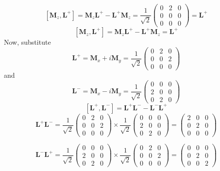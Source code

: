 \documentclass{styles/kaobook}
\begin{document}
$$
\left[\mathbf{M}_{z}, \mathbf{L}^{+}\right]=\mathbf{M}_{z} \mathbf{L}^{+}-\mathbf{L}^{+} \mathbf{M}_{z}=\frac{1}{\sqrt{2}}\left(\begin{array}{ccc}
0 & 2 & 0 \\
0 & 0 & 0 \\
0 & 0 & 0
\end{array}\right)=\mathbf{L}^{+}
$$
$$
\left[\mathbf{M}_{z}, \mathbf{L}^{+}\right]=\mathbf{M}_{z} \mathbf{L}^{+}-\mathbf{L}^{+} \mathbf{M}_{z}=\mathbf{L}^{+}
$$
Now, substitute 
$$
\mathbf{L}^{+}=\mathbf{M}_{x}+i \mathbf{M}_{y}=\frac{1}{\sqrt{2}}\left(\begin{array}{lll}
0 & 2 & 0 \\
0 & 0 & 2 \\
0 & 0 & 0
\end{array}\right)
$$
and
$$
\mathbf{L}^{-}=\mathbf{M}_{x}-i \mathbf{M}_{y}=\frac{1}{\sqrt{2}}\left(\begin{array}{ccc}
0 & 0 & 0 \\
2 & 0 & 0 \\
0 & 2 & 0
\end{array}\right)
$$
$$
\left[\mathbf{L}^{+}, \mathbf{L}^{-}\right]=\mathbf{L}^{+} \mathbf{L}^{-}-\mathbf{L}^{-} \mathbf{L}^{+}
$$
$$
\mathbf{L}^{+} \mathbf{L}^{-}=\frac{1}{\sqrt{2}}\left(\begin{array}{lll}
0 & 2 & 0 \\
0 & 0 & 2 \\
0 & 0 & 0
\end{array}\right) \times \frac{1}{\sqrt{2}}\left(\begin{array}{lll}
0 & 0 & 0 \\
2 & 0 & 0 \\
0 & 2 & 0
\end{array}\right)=\left(\begin{array}{lll}
2 & 0 & 0 \\
0 & 2 & 0 \\
0 & 0 & 0
\end{array}\right)
$$

$$
\mathbf{L}^{-} \mathbf{L}^{+}=\frac{1}{\sqrt{2}}\left(\begin{array}{lll}
0 & 0 & 0 \\
2 & 0 & 0 \\
0 & 2 & 0
\end{array}\right) \times \frac{1}{\sqrt{2}}\left(\begin{array}{lll}
0 & 2 & 0 \\
0 & 0 & 2 \\
0 & 0 & 0
\end{array}\right)=\left(\begin{array}{lll}
0 & 0 & 0 \\
0 & 2 & 0 \\
0 & 0 & 2
\end{array}\right)
$$
\end{document}
